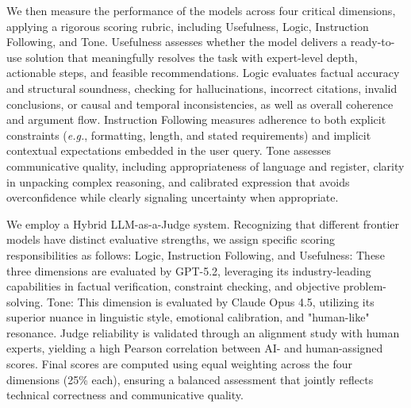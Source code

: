 We then measure the performance of the models across four critical dimensions, applying a rigorous scoring rubric, including Usefulness, Logic, Instruction Following, and Tone. Usefulness assesses whether the model delivers a ready-to-use solution that meaningfully resolves the task with expert-level depth, actionable steps, and feasible recommendations. Logic evaluates factual accuracy and structural soundness, checking for hallucinations, incorrect citations, invalid conclusions, or causal and temporal inconsistencies, as well as overall coherence and argument flow. Instruction Following measures adherence to both explicit constraints (\textit{e.g.}, formatting, length, and stated requirements) and implicit contextual expectations embedded in the user query. Tone assesses communicative quality, including appropriateness of language and register, clarity in unpacking complex reasoning, and calibrated expression that avoids overconfidence while clearly signaling uncertainty when appropriate.


We employ a Hybrid LLM-as-a-Judge system. Recognizing that different frontier models have distinct evaluative strengths, we assign specific scoring responsibilities as follows: Logic, Instruction Following, and Usefulness: These three dimensions are evaluated by GPT-5.2, leveraging its industry-leading capabilities in factual verification, constraint checking, and objective problem-solving. Tone: This dimension is evaluated by Claude Opus 4.5, utilizing its superior nuance in linguistic style, emotional calibration, and "human-like" resonance.
Judge reliability is validated through an alignment study with human experts, yielding a high Pearson correlation between AI- and human-assigned scores. Final scores are computed using equal weighting across the four dimensions (25\% each), ensuring a balanced assessment that jointly reflects technical correctness and communicative quality.


